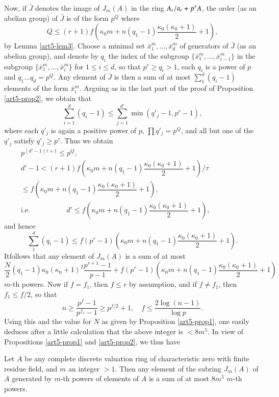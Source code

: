 Now, if $\bar J$ denotes the image of $J_m(A)$ in the ring $A_r/\mathfrak{a}_r + p^{\tau} A$, the order (as an abelian group) of $\bar J$ is of the form $p^Q$ where 
$$
Q \leq (r+1) f \left( \kappa_0 m + n (q_1 -1) \dfrac{\kappa_0 (\kappa_0 +1)}{2} + 1\right),
$$
by Lemma \ref{art5-lem3}. Choose a minimal set $\bar{x}_1^m, \ldots, \bar{x}_d^m $ of generators of $\bar{J}$ (as an abelian group), and denote by $q_i$ the index of the subgroup $\{\bar{x}^m_1, \ldots, \bar{x}^m_{i-1}\}$ in the subgroup $\{\bar{x}^m_1, \ldots, \bar{x}^m_i\}$ for $1 \leq i \leq d$, so that $p^r \geq q_i > 1$, each $q_i$ is a power of $p$ and $q_1 \ldots q_d = p^Q$. Any element of $\bar{J}$ is then a sum of at most $\sum\limits^d_1 (q_i -1)$ elements of the form $\bar{x}^m_i$. Arguing as in the last part of the proof of Proposition \ref{art5-prop2}, we obtain that 
$$
\sum\limits^d_{i=1} (q_i -1) \leq \sum\limits^{d'}_{j=1} \min (q'_j - 1, p^r -1),
$$
where each $q'_j$ is again a positive power of $p$, $\prod q'_j = p^Q$, and all but one of the $q'_j$ satisfy $q'_j \geq p^\tau$. Thus we obtain
\begin{gather*}
p^{(d'-1) \tau + 1} \leq p^Q,\\
d'-1 < (r+1) f \left(\kappa_0 m + n (q_1 -1) \dfrac{\kappa_0 (\kappa_0 + 1)}{2} + 1 \right) / \tau\\
\leq f \left( \kappa_0 m + n (q_1 -1) \dfrac{\kappa_0 (\kappa_0 +1)}{2} +1\right),\\
\text{i.e. } \hspace{2cm} d' \leq f \left(\kappa_0 m + n (q_1-1) \dfrac{\kappa_0 (\kappa_0+1)}{2} +1 \right), \hspace{2cm}
\end{gather*}
and hence
$$
\sum\limits^d_1 (q_i -1) \leq f (p^\tau -1) \left(\kappa_0 m +n (q_1 -1) \dfrac{\kappa_0 (\kappa_0 +1)}{2} +1 \right).
$$
It\pageoriginale follows that any element of $J_m(A)$ is a sum of at most 
$$
\dfrac{N}{2} (q_1-1) \kappa_0 (\kappa_0+1)^2 \dfrac{p^{r+1} -1}{p-1} + f (p^\tau -1) \left(\kappa_0 m + n (q_1-1) \dfrac{\kappa_0 (\kappa_0+1)}{2} +1 \right) 
$$
$m$-th powers. Now if $f = f_1$, then $f \leq r$ by assumption, and if $f \neq f_1$, then $f_1 \leq f/2$, so that 
$$
n \geq \dfrac{p^f -1}{p^{f_1} -1} \geq p^{f/2} +1,\quad f \leq \dfrac{2\log (n-1)}{\log p}.
$$
Using this and the value for $N$ as given by Proposition \ref{art5-prop1}, one easily deduces after a little calculation that the above integer is $< 8 m^5$. In view of Propositions \ref{art5-prop1} and \ref{art5-prop2}, we thus have 

\begin{prop}\label{art5-prop3}
Let $A$ be any complete discrete valuation ring of characteristic zero with finite residue field, and $m$ an integer $>1$. Then any element of the subring $J_m(A)$ of $A$ generated by $m$-th powers of elements of $A$ is a sum of at most $8m^5$ $m$-th powers.
\end{prop} 

